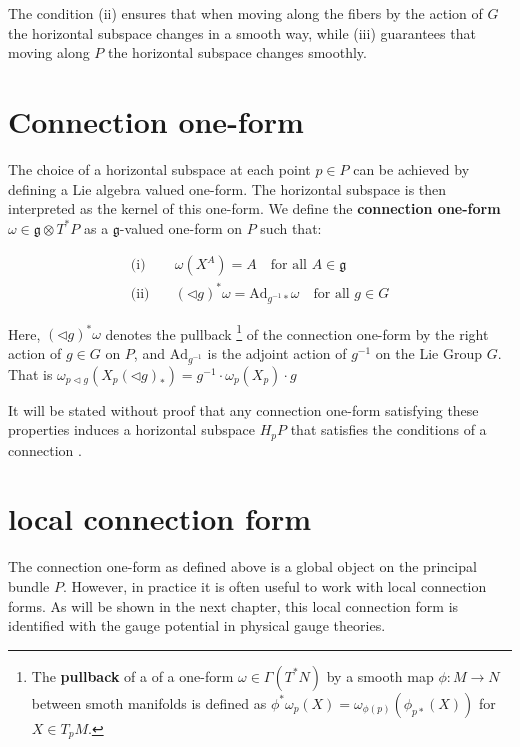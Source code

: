 The condition (ii) ensures that when moving along the fibers by the action of \( G \) the horizontal subspace changes in a smooth way, while (iii) guarantees that moving along \( P \) the horizontal subspace changes smoothly.


\section{Connection one-form}

The choice of a horizontal subspace at each point \( p \in P \) can be achieved by defining a Lie algebra valued one-form. The horizontal subspace is then interpreted as the kernel of this one-form. We define the \textbf{connection one-form} \( \omega \in \mathfrak{g} \otimes T^*P \) as a \( \mathfrak{g} \)-valued one-form on \( P \) such that:

\begin{align*}
  \text{(i)}\quad 
    & \omega(X^A) = A \quad \text{for all } A \in \mathfrak{g} \\
  \text{(ii)}\quad 
    & (\triangleleft g)^* \omega = \text{Ad}_{g^{-1}*} \omega \quad \text{for all } g \in G 
\end{align*}

Here, \( (\triangleleft g)^* \omega \) denotes the pullback
\footnote{The \textbf{pullback} of a of a one-form \( \omega \in \Gamma(T^*N) \) by a smooth map \( \phi: M \rightarrow N \) between smoth manifolds is defined as \( \phi^* \omega_p(X) = \omega_{\phi(p)}(\phi_{p*}(X)) \) for \( X \in T_pM \).\cite{Pullbackdifferentialgeometry2024}}
of the connection one-form by the right action of \( g \in G \) on \( P \), and \( \text{Ad}_{g^{-1}} \) is the adjoint action of \( g^{-1} \) on the Lie Group \( G \). That is \( \omega_{p \triangleleft g}(X_p(\triangleleft g)_*) = g^{-1} \cdot \omega_p(X_p) \cdot g \)


It will be stated without proof that any connection one-form satisfying these properties induces a horizontal subspace \( H_pP \) that satisfies the conditions of a connection \cite{FredericSchullerConncectionsconnection1formsLec21FredericSchuller2015}.



\section{local connection form}

The connection one-form as defined above is a global object on the principal bundle \( P \). However, in practice it is often useful to work with local connection forms. As will be shown in the next chapter, this local connection form is identified with the gauge potential in physical gauge theories.

